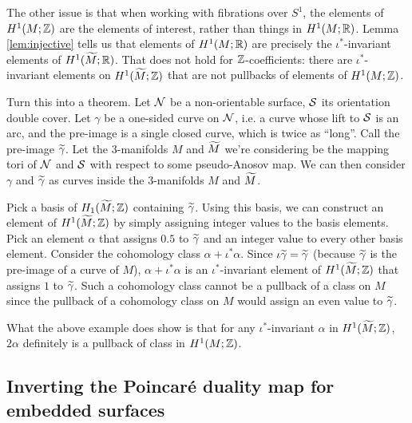 The other issue is that when working with fibrations over $S^1$, the elements of $H^1(M; \mathbb{Z})$ are
the elements of interest, rather than things in $H^1(M; \mathbb{R})$. Lemma \ref{lem:injective} tells us
that elements of $H^1(M; \mathbb{R})$ are precisely the $\iota^{\ast}$-invariant elements of
$H^1(\widetilde{M}; \mathbb{R})$. That does not hold for $\mathbb{Z}$-coefficients: there are $\iota^{\ast}$-invariant
elements on $H^1(\widetilde{M}; \mathbb{Z})$ that are not pullbacks of elements of $H^1(M; \mathbb{Z})$.
\begin{example}
  {\color{red} Turn this into a theorem.}
  Let $\mathcal{N}$ be a non-orientable surface, $\mathcal{S}$ its orientation double cover. Let $\gamma$ be a
  one-sided curve on $\mathcal{N}$, i.e. a curve whose lift to $\mathcal{S}$ is an arc, and the pre-image is a
  single closed curve, which is twice as ``long''. Call the pre-image $\widetilde{\gamma}$. Let the
  $3$-manifolds $M$ and $\widetilde{M}$ we're considering be the mapping tori of $\mathcal{N}$ and $\mathcal{S}$ with
  respect to some pseudo-Anosov map. We can then consider $\gamma$ and $\widetilde{\gamma}$ as curves
  inside the $3$-manifolds $M$ and $\widetilde{M}$.

  Pick a basis of $H_1(\widetilde{M}; \mathbb{Z})$ containing $\widetilde{\gamma}$. Using this basis, we can construct an element
  of $H^1(\widetilde{M}; \mathbb{Z})$ by simply assigning integer values to the basis elements.  Pick an element $\alpha$ that assigns $0.5$ to $\widetilde{\gamma}$ and an
  integer value to every other basis element. Consider the cohomology class $\alpha +
  \iota^{\ast}\alpha$. Since $\iota \widetilde{\gamma} = \widetilde{\gamma}$ (because $\widetilde{\gamma}$ is the pre-image of a
  curve of $M$), $\alpha + \iota^{\ast}\alpha$ is an $\iota^{\ast}$-invariant element of $H^1(\widetilde{M}; \mathbb{Z})$
  that assigns $1$ to $\widetilde{\gamma}$. Such a cohomology class cannot be a pullback of a class on $M$ since the
  pullback of a cohomology class on $M$ would assign an even value to $\widetilde{\gamma}$.
\end{example}

What the above example does show is that for any $\iota^{\ast}$-invariant $\alpha$ in
$H^1(\widetilde{M}; \mathbb{Z})$, $2\alpha$ definitely is a pullback of class in $H^1(M; \mathbb{Z})$.

\subsection{Inverting the Poincar\'e duality map for embedded surfaces}
\label{sec:invert-poincare}

